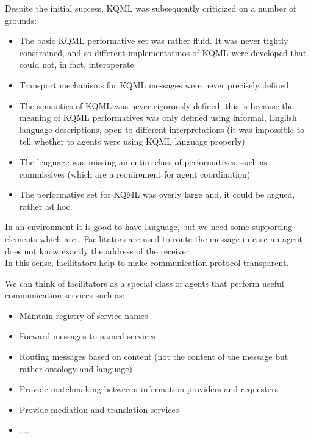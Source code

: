 Despite the initial success, KQML was subsequently criticized on a number of grounds:
\begin{itemize}
\item The basic KQML performative set was rather fluid. It was never tightly constrained, and so different implementatinos of KQML were developed that could not, in fact, interoperate
\item Transport mechanisms for KQML messages were never precisely defined
\item The semantics of KQML was never rigorously defined. this is because the meaning of KQML performatives was only defined using informal, English language descriptions, open to different interpretations (it was impossible to tell whether to agents were using KQML language properly)
\item The lenguage was missing an entire class of performatives, such as commissives (which are a requirement for agent coordination)
\item The performative set for KQML was overly large and, it could be argued, rather ad hoc.
\end{itemize}

In an environment it is good to have language, but we need some supporting elements which are . Facilitators are used to route the message in case an agent does not know exactly the address of the receiver.\\
In this sense, facilitators help to make communication protocol transparent.

We can think of facilitators as a special class of agents that perform useful communication services such as:
\begin{itemize}
\item Maintain registry of service names
\item Forward messages to named services
\item Routing messages based on content (not the content of the message but rather ontology and language)
\item Provide matchmaking betweeen information providers and requesters
\item Provide mediation and translation services
\item  ....
\end{itemize}

